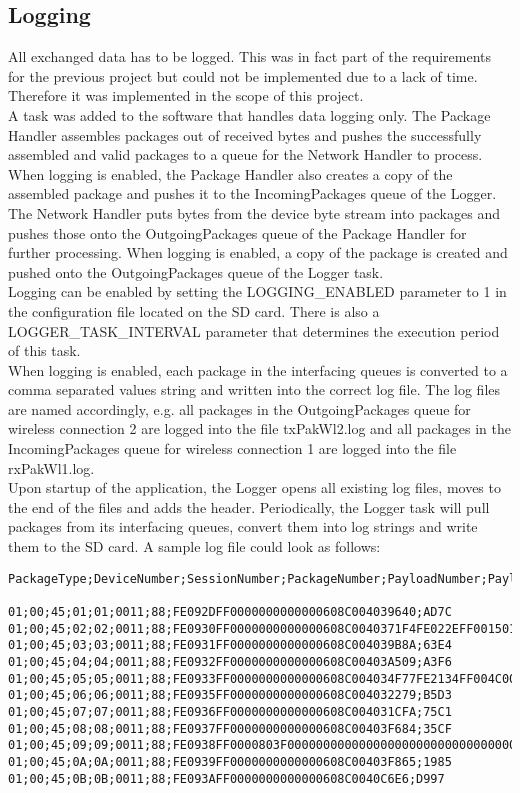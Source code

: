\subsection{Logging} \label{subsec:txtLoggingTask}
All exchanged data has to be logged. This was in fact part of the requirements for the previous project but could not be implemented due to a lack of time. Therefore it was implemented in the scope of this project.\\
A task was added to the software that handles data logging only. The Package Handler assembles packages out of received bytes and pushes the successfully assembled and valid packages to a queue for the Network Handler to process. When logging is enabled, the Package Handler also creates a copy of the assembled package and pushes it to the IncomingPackages queue of the Logger.\\
The Network Handler puts bytes from the device byte stream into packages and pushes those onto the OutgoingPackages queue of the Package Handler for further processing. When logging is enabled, a copy of the package is created and pushed onto the OutgoingPackages queue of the Logger task.\\
Logging can be enabled by setting the LOGGING\_ENABLED parameter to 1 in the configuration file located on the SD card. There is also a LOGGER\_TASK\_INTERVAL parameter that determines the execution period of this task.\\
When logging is enabled, each package in the interfacing queues is converted to a comma separated values string and written into the correct log file. The log files are named accordingly, e.g. all packages in the OutgoingPackages queue for wireless connection 2 are logged into the file txPakWl2.log and all packages in the IncomingPackages queue for wireless connection 1 are logged into the file rxPakWl1.log.\\
Upon startup of the application, the Logger opens all existing log files, moves to the end of the files and adds the header. Periodically, the Logger task will pull packages from its interfacing queues, convert them into log strings and write them to the SD card. A sample log file could look as follows:
%
\begin{lstlisting}
PackageType;DeviceNumber;SessionNumber;PackageNumber;PayloadNumber;PayloadSize;CRC8_Header;Payload;CRC16_Payload

01;00;45;01;01;0011;88;FE092DFF0000000000000608C004039640;AD7C
01;00;45;02;02;0011;88;FE0930FF0000000000000608C0040371F4FE022EFF00150100;1245
01;00;45;03;03;0011;88;FE0931FF0000000000000608C004039B8A;63E4
01;00;45;04;04;0011;88;FE0932FF0000000000000608C00403A509;A3F6
01;00;45;05;05;0011;88;FE0933FF0000000000000608C004034F77FE2134FF004C0000;FD86
01;00;45;06;06;0011;88;FE0935FF0000000000000608C004032279;B5D3
01;00;45;07;07;0011;88;FE0936FF0000000000000608C004031CFA;75C1
01;00;45;08;08;0011;88;FE0937FF0000000000000608C00403F684;35CF
01;00;45;09;09;0011;88;FE0938FF0000803F0000000000000000000000000000000000000000;7822
01;00;45;0A;0A;0011;88;FE0939FF0000000000000608C00403F865;1985
01;00;45;0B;0B;0011;88;FE093AFF0000000000000608C0040C6E6;D997
\end{lstlisting}
